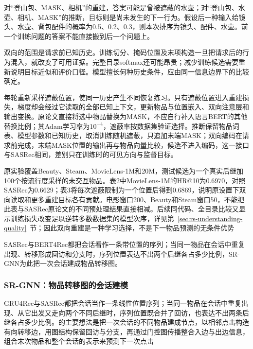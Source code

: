 对“登山包、MASK、相机”的重建，答案可能是曾被遮蔽的水壶；对“登山包、水壶、相机、MASK”的推断，目标则是尚未发生的下一行为。假设后一种输入给镜头、水壶、背包配件的概率为0.5、0.2、0.3，则本次排序为镜头、配件、水壶。前一个训练问题的答案不能直接搬到后一个问题上。

双向的范围是请求前已知历史。训练切分、掩码位置及末项构造一旦把请求后的行为混入，就改变了可用证据。完整目录softmax还可能昂贵；减少训练候选需要重新说明目标近似和评价口径。模型擅长何种历史条件，应由同一信息边界下的比较确定。

每轮重新采样遮蔽位置，使同一历史产生不同恢复练习。只有遮蔽位置进入重建损失，梯度却会经过它读取的全部已知上下文，更新物品与位置嵌入、双向注意层和输出变换。原论文直接将选中物品替换为MASK，不应自行补入语言BERT的其他替换比例；其Adam学习率为$10^{-4}$，遮蔽率按数据集验证选择。推断保留物品词表、模型参数和已知历史，取消训练随机遮蔽，只追加末端MASK；双向编码在请求前完成，末端MASK位置的输出再与物品向量比较，候选不进入编码，这一接口与SASRec相同，差别只在训练时的可见方向与监督目标。

原实验覆盖Beauty、Steam、MovieLens-1M和20M，测试候选为一个真实后继加100个按流行度采样的未交互物品。表2中MovieLens-1M的HR@10为0.6970，对照SASRec为0.6629；表3将每次遮蔽限制为一个位置后得到0.6869，说明原设置下双向读取和更多重建目标各有贡献。电影窗口200、Beauty和Steam窗口50，不能把此表与SASRec原论文的不同预处理结果直接相减。后续同代码、全目录比较又显示训练损失改变足以逆转多数数据集的模型次序，详见第~\ref{sec:rs-understanding-quality}~节；因此双向重建是一种学习选择，不是下一物品预测的无条件优势

SASRec与BERT4Rec都把会话看作一条带位置的序列；当同一物品在会话中重复出现、转移形成回访和分支时，序列位置表达不出两个后继各占多少比例，SR-GNN为此把一次会话建成物品转移图。
\subsubsection{SR-GNN：物品转移图的会话建模}
\label{sec:rs-srgnn}

GRU4Rec与SASRec都把会话当作一条线性位置序列；当同一物品在会话中重复出现、从它出发又走向两个不同后继时，序列位置既合并了回访，也表达不出两条后继各占多少比例。的主要想法是把一次会话的不同物品建成节点，以相邻点击构造有向转移边，用图结构保留回访与分支，再通过门控图传播整合入边与出边信息，组合末次物品和整个会话的表示来预测下一次点击

